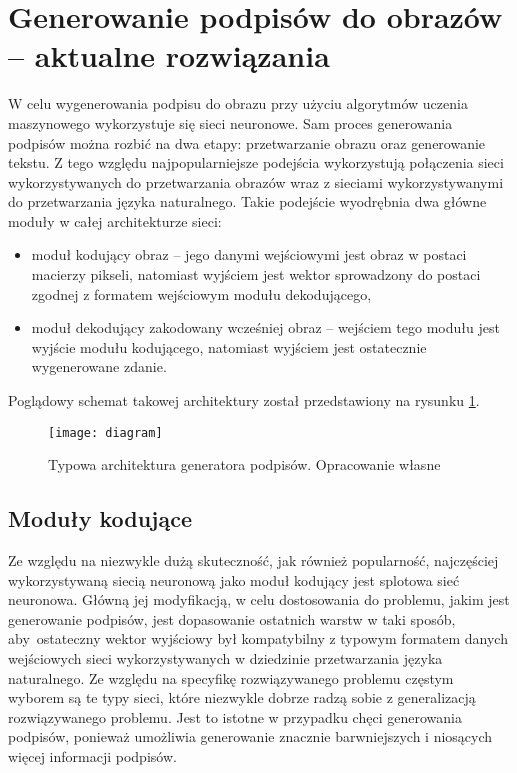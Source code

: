 \newpage %
\section{Generowanie podpisów do obrazów -- aktualne rozwiązania}
W celu wygenerowania podpisu do obrazu przy użyciu algorytmów uczenia maszynowego wykorzystuje się sieci neuronowe. Sam proces generowania podpisów można rozbić na dwa etapy: przetwarzanie obrazu oraz generowanie tekstu. Z tego względu najpopularniejsze podejścia wykorzystują połączenia sieci wykorzystywanych do przetwarzania obrazów wraz z sieciami wykorzystywanymi do przetwarzania języka naturalnego. Takie podejście wyodrębnia dwa główne moduły w całej architekturze sieci:
\begin{itemize}
  \item moduł kodujący obraz -- jego danymi wejściowymi jest obraz w postaci macierzy pikseli, natomiast wyjściem jest wektor sprowadzony do postaci zgodnej z formatem wejściowym modułu dekodującego,
  \item moduł dekodujący zakodowany wcześniej obraz -- wejściem tego modułu jest wyjście modułu kodującego, natomiast wyjściem jest ostatecznie wygenerowane zdanie.
\end{itemize}
\noindent Poglądowy schemat takowej architektury został przedstawiony na rysunku \ref{fig:schemat-captioning}.
\begin{figure}[H]
  \centering
  \texttt{[image: diagram]}
  \caption{Typowa architektura generatora podpisów. Opracowanie własne}
  \label{fig:schemat-captioning}
\end{figure}
\subsection{Moduły kodujące}
Ze względu na niezwykle dużą skuteczność, jak również popularność, najczęściej wykorzystywaną siecią neuronową jako moduł kodujący jest splotowa sieć neuronowa. Główną jej modyfikacją, w celu dostosowania do problemu, jakim jest generowanie podpisów, jest dopasowanie ostatnich warstw w taki sposób, aby~ostateczny wektor wyjściowy był kompatybilny z typowym formatem danych wejściowych sieci wykorzystywanych w dziedzinie przetwarzania języka naturalnego. Ze względu na specyfikę rozwiązywanego problemu częstym wyborem są te typy sieci, które niezwykle dobrze radzą sobie z generalizacją rozwiązywanego problemu. Jest to istotne w przypadku chęci generowania podpisów, ponieważ umożliwia generowanie znacznie barwniejszych i niosących więcej informacji podpisów.
